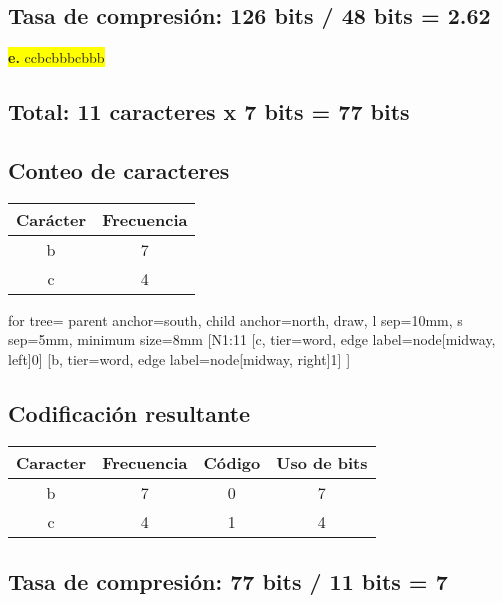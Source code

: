 \documentclass{article}
\begin{document}
\begin{center}
		\subsection*{Tasa de compresión: 126 bits / 48 bits = 2.62}	
	\end{center}
	
	\vspace{0.5cm}
	\begin{center}
		\hspace{3cm}\colorbox{yellow}{{\textbf{e.} ccbcbbbcbbb}}\newline
		\subsection*{Total: 11 caracteres x 7 bits = 77 bits}
		\vspace{0.5cm}
		\subsection*{Conteo de caracteres}
		\begin{tabular}{c|c}
			\textbf{Carácter} & \textbf{Frecuencia} \\
			\hline
			b & 7 \\
			c & 4 \\
		\end{tabular}
		
		\vspace{1cm}
		
		\begin{forest}
			for tree={
				parent anchor=south,
				child anchor=north,
				draw,
				l sep=10mm,
				s sep=5mm,
				minimum size=8mm
			}
			[N1:11
			[c, tier=word, edge label={node[midway, left]{0}}]
			[b, tier=word, edge label={node[midway, right]{1}}]
			]
		\end{forest}
		
		
		\subsection*{Codificación resultante}
		\begin{tabular}{c|c|c|c}
			\textbf{Caracter} & \textbf{Frecuencia} & \textbf{Código} & \textbf{Uso de bits}\\
			\hline
			b & 7 & 0 & 7\\
			c & 4 & 1 & 4\\
		\end{tabular}
		\subsection*{Tasa de compresión: 77 bits / 11 bits = 7}	
	\end{center}
	
\end{document}

